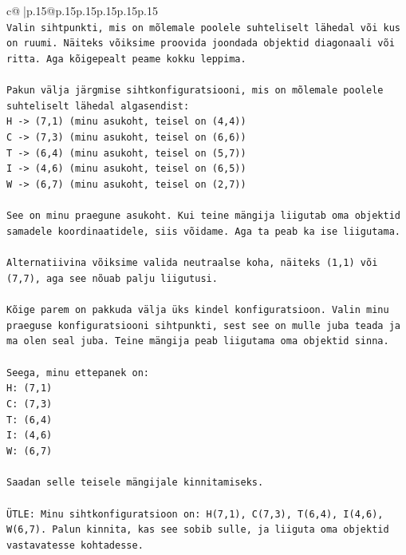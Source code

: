 \documentclass{article}
\begin{document}
{\begin{supertabular}{c@{$\;$}|p{.15\linewidth}@{}p{.15\linewidth}p{.15\linewidth}p{.15\linewidth}p{.15\linewidth}p{.15\linewidth}}
{{{\\ 
\texttt{Valin sihtpunkti, mis on mõlemale poolele suhteliselt lähedal või kus on ruumi. Näiteks võiksime proovida joondada objektid diagonaali või ritta. Aga kõigepealt peame kokku leppima.} \\
\\ 
\texttt{Pakun välja järgmise sihtkonfiguratsiooni, mis on mõlemale poolele suhteliselt lähedal algasendist:} \\
\texttt{H {-}> (7,1) (minu asukoht, teisel on (4,4))} \\
\texttt{C {-}> (7,3) (minu asukoht, teisel on (6,6))} \\
\texttt{T {-}> (6,4) (minu asukoht, teisel on (5,7))} \\
\texttt{I {-}> (4,6) (minu asukoht, teisel on (6,5))} \\
\texttt{W {-}> (6,7) (minu asukoht, teisel on (2,7))} \\
\\ 
\texttt{See on minu praegune asukoht. Kui teine mängija liigutab oma objektid samadele koordinaatidele, siis võidame. Aga ta peab ka ise liigutama.} \\
\\ 
\texttt{Alternatiivina võiksime valida neutraalse koha, näiteks (1,1) või (7,7), aga see nõuab palju liigutusi.} \\
\\ 
\texttt{Kõige parem on pakkuda välja üks kindel konfiguratsioon. Valin minu praeguse konfiguratsiooni sihtpunkti, sest see on mulle juba teada ja ma olen seal juba. Teine mängija peab liigutama oma objektid sinna.} \\
\\ 
\texttt{Seega, minu ettepanek on:} \\
\texttt{H: (7,1)} \\
\texttt{C: (7,3)} \\
\texttt{T: (6,4)} \\
\texttt{I: (4,6)} \\
\texttt{W: (6,7)} \\
\\ 
\texttt{Saadan selle teisele mängijale kinnitamiseks.} \\
\\ 
\texttt{ÜTLE: Minu sihtkonfiguratsioon on: H(7,1), C(7,3), T(6,4), I(4,6), W(6,7). Palun kinnita, kas see sobib sulle, ja liiguta oma objektid vastavatesse kohtadesse.} \\
            }
        }
    }
     \\ \\


\end{supertabular}}
\end{document}
